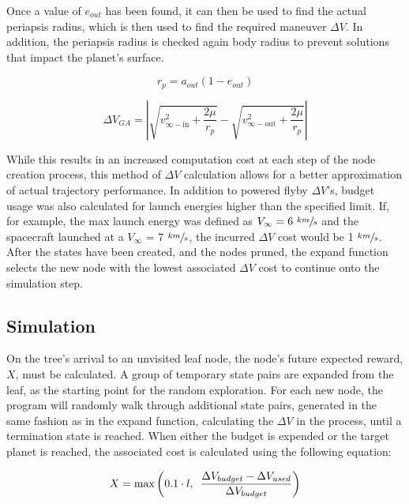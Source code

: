 \documentclass[letterpaper, preprint, paper,11pt]{AAS}	%
\begin{document}
Once a value of $e_{out}$ has been found, it can then be used to find the actual periapsis radius, which is then used to find the required maneuver $\Delta V$. In addition, the periapsis radius is checked again body radius to prevent solutions that impact the planet's surface.

\begin{equation}
    r_p = a_{out}(1 - e_{out})
\end{equation}

\begin{equation}
    \Delta V_{GA} = \left| \sqrt{ v^2_{\infty-\text{in}} + \frac{2\mu}{r_p} } - \sqrt{ v^2_{\infty-\text{out}} + \frac{2\mu}{r_p} } \right|
\end{equation}

While this results in an increased computation cost at each step of the node creation process, this method of $\Delta V$ calculation allows for a better approximation of actual trajectory performance. In addition to powered flyby $\Delta V$'s, budget usage was also calculated for launch energies higher than the specified limit. If, for example, the max launch energy was defined as $V_\infty = 6 \text{ }\sfrac{km}{s}$ and the spacecraft launched at a $V_\infty$ = 7 $\sfrac{km}{s}$, the incurred $\Delta V$ cost would be 1 $\sfrac{km}{s}$. After the states have been created, and the nodes pruned, the expand function selects the new node with the lowest associated $\Delta V$ cost to continue onto the simulation step.

\subsection{Simulation}

On the tree's arrival to an unvisited leaf node, the node's future expected reward, $X$, must be calculated. A group of temporary state pairs are expanded from the leaf, as the starting point for the random exploration. For each new node, the program will randomly walk through additional state pairs, generated in the same fashion as in the expand function, calculating the $\Delta V$ in the process, until a termination state is reached. When either the budget is expended or the target planet is reached, the associated cost is calculated using the following equation:

\begin{equation}
    \label{eq:simCost1}
    X = \text{max}\left( 0.1 \cdot l,\hspace{0.5em} \frac{\Delta V_{budget} - \Delta V_{used}}{\Delta V_{budget}} \right)
\end{equation}
\end{document}
